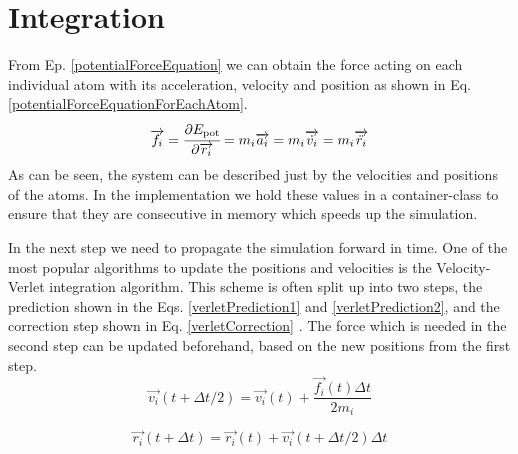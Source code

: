 \section{Integration}
\begin{comment}
- obtain force from the previous equation
- dirivation in v. r.. from the mass
- system can be discribed just by the velocity and postion of each atom
- in the simulation the positions and velocities of the individual atoms have to be tracked and updated accordingly
- most used  is the Velocity-Verlet Algorithm
\end{comment}
From Ep. \ref{potentialForceEquation} we can obtain the force acting on each individual atom with its acceleration, velocity and position as shown in  Eq. \ref{potentialForceEquationForEachAtom}. 
\begin{equation}
	\label{potentialForceEquationForEachAtom}
	\overrightarrow{f_{i}} = \cfrac{\displaystyle\partial E_{\mathrm{pot}}}{\displaystyle \partial \overrightarrow{r_{i}}} = m_{i}\overrightarrow{a_{i}} = m_{i}\overrightarrow{\dot{v_{i}}} = m_{i}\overrightarrow{\ddot{r_{i}}}
\end{equation}
As can be seen, the system can be described just by the velocities and positions of the atoms. 
In the implementation we hold these values in a container-class to ensure that they are consecutive in  memory which speeds up the simulation. 
\par
In the next step we need to propagate the simulation forward in time. One of the most popular algorithms to update the positions and velocities is the Velocity-Verlet integration algorithm.
This scheme is often split up into two steps, the prediction shown in the Eqs.  \ref{verletPrediction1} and \ref{verletPrediction2}, and the correction step shown in Eq. \ref{verletCorrection} \cite[cf. ][]{molDymCourse}. The force which is needed in the second step can be updated beforehand, based on the new positions from the first step.
\begin{equation}
	\label{verletPrediction1}
	\overrightarrow{v_{i}}(t+\Delta t/2) = 
	\overrightarrow{v_{i}}(t) + 
	\frac{\overrightarrow{f_{i}}(t)\Delta t}{2m_{i}}
\end{equation}

\begin{equation}
	\label{verletPrediction2}
	\overrightarrow{r_{i}}(t+ \Delta t) = 
	\overrightarrow{r_{i}}(t) + \overrightarrow{v_{i}}(t + \Delta t/2)\Delta t
\end{equation}

